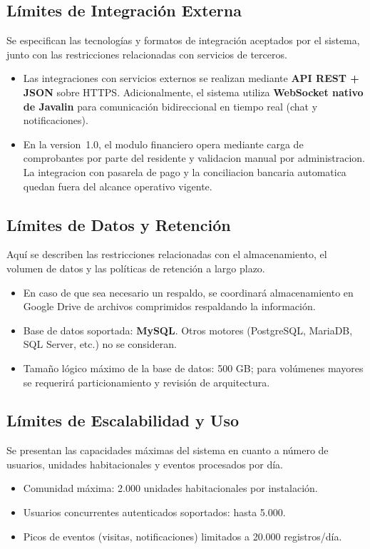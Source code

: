 \subsection{Límites de Integración Externa}
Se especifican las tecnologías y formatos de integración aceptados por el sistema, junto con las restricciones relacionadas con servicios de terceros.

\begin{itemize}
    \item Las integraciones con servicios externos se realizan mediante \textbf{API REST + JSON} sobre HTTPS. Adicionalmente, el sistema utiliza \textbf{WebSocket nativo de Javalin} para comunicación bidireccional en tiempo real (chat y notificaciones).
    \item En la version~1.0, el modulo financiero opera mediante carga de comprobantes por parte del residente y validacion manual por administracion. La integracion con pasarela de pago y la conciliacion bancaria automatica quedan fuera del alcance operativo vigente.
\end{itemize}

\subsection{Límites de Datos y Retención}
Aquí se describen las restricciones relacionadas con el almacenamiento, el volumen de datos y las políticas de retención a largo plazo.

\begin{itemize}
    \item En caso de que sea necesario un respaldo, se coordinará almacenamiento en Google Drive de archivos comprimidos respaldando la información.
    \item Base de datos soportada: \textbf{MySQL}. Otros motores (PostgreSQL, MariaDB, SQL Server, etc.) no se consideran.
    \item Tamaño lógico máximo de la base de datos: 500 GB; para volúmenes mayores se requerirá particionamiento y revisión de arquitectura.
\end{itemize}

\subsection{Límites de Escalabilidad y Uso}
Se presentan las capacidades máximas del sistema en cuanto a número de usuarios, unidades habitacionales y eventos procesados por día.

\begin{itemize}
    \item Comunidad máxima: 2.000 unidades habitacionales por instalación.
    \item Usuarios concurrentes autenticados soportados: hasta 5.000.
    \item Picos de eventos (visitas, notificaciones) limitados a 20.000 registros/día.
\end{itemize}

